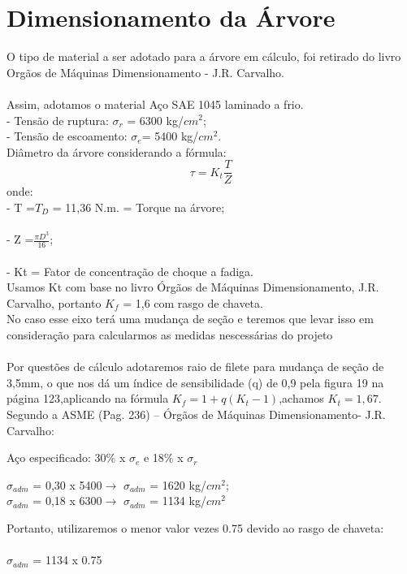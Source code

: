 \documentclass[a4paper, 11pt]{article}
\begin{document}
\section{Dimensionamento da \'Arvore}
O tipo de material a ser adotado para a \'arvore em c\'alculo, foi retirado do
livro Org\~aos de M\'aquinas Dimensionamento - J.R. Carvalho.\\\\
Assim, adotamos o material Aço SAE 1045 laminado a frio.\\
- Tens\~ao de ruptura: $\sigma_r$ = 6300 kg/$cm^2$;\\
- Tens\~ao de escoamento: $\sigma_e$= 5400 kg/$cm^2$.\\
Di\^ametro da \'arvore considerando a fórmula:\\
$$\tau=K_t\frac{T}{Z}$$
onde:\\
- T =$T_D$ = 11,36 N.m. = Torque na \'arvore;\\\\
- Z =$\frac{\pi D^3}{16}$;\\\\
- Kt = Fator de concentra\c{c}\~ao de choque a fadiga.\\
Usamos Kt com base no livro \'Org\~aos de M\'aquinas Dimensionamento, J.R.
Carvalho, portanto $K_f$ = 1,6 com rasgo de chaveta.\\
No caso esse eixo ter\'a uma mudan\c{c}a de se\c{c}\~ao e teremos que levar isso em considera\c{c}\~ao para calcularmos as medidas nescess\'arias do projeto\\
\\
 Por quest\~oes de c\'alculo adotaremos raio de filete para mudan\c{c}a de se\c{c}\~ao de 3,5mm, o que nos d\'a um \'indice de sensibilidade (q) de 0,9 pela figura 19 na p\'agina 123,aplicando na f\'ormula $K_f=1+q(K_t-1)$,achamos $K_t=1,67$. \\
Segundo a ASME (Pag. 236) – Órgãos de M\'aquinas Dimensionamento-
J.R. Carvalho:
\begin{center}
A\c{c}o especificado: 30$\%$ x $\sigma_e$ e 18$\%$ x $\sigma_r$

$\sigma_{adm}$ = 0,30 x 5400$\rightarrow$ $\sigma_{adm}$ = 1620 kg/$cm^2$;\\
$\sigma_{adm}$ = 0,18 x 6300$\rightarrow$ $\sigma_{adm}$ = 1134 kg/$cm^2$
\end{center}
Portanto, utilizaremos o menor valor vezes 0.75 devido ao rasgo de
chaveta:\\\\
$\sigma_{adm}$ = 1134 x 0.75\\
\end{document}
